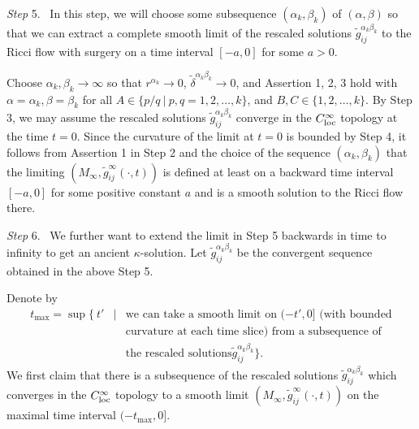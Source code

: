 \medskip
{\it Step} 5. \ In this step, we will choose some subsequence
$(\alpha_k,\beta_k)$ of $(\alpha,\beta)$ so that we can extract a
complete smooth limit of the rescaled solutions
$\widetilde{g}^{\alpha_k \beta_k}_{ij}$ to the Ricci flow with
surgery on a time interval $[-a,0]$ for some $a>0$.

Choose $\alpha_k,\beta_k\rightarrow\infty$ so that
$r^{\alpha_k}\rightarrow0$,
$\widetilde{\delta}^{\alpha_{k}\beta_{k}}\rightarrow 0$, and
Assertion 1, 2, 3 hold with $\alpha=\alpha_k, \beta=\beta_k$ for
all $A \in \{{p}/{q} \ |\ p, q=1, 2, \ldots, k\}$, and $B,C \in
\{1,2,\ldots,k\}$. By Step 3, we may assume the rescaled solutions
$\widetilde{g}^{\alpha_k \beta_k}_{ij}$ converge in the
$C^{\infty}_{\rm loc}$ topology at the time $t=0$. Since the
curvature of the limit at $t=0$ is bounded by Step 4, it follows
from Assertion 1 in Step 2 and the choice of the sequence
$(\alpha_k,\beta_k)$ that the limiting
$(M_{\infty},\widetilde{g}^{\infty}_{ij}(\cdot,t))$ is defined at
least on a backward time interval $[-a,0]$ for some positive
constant $a$ and is a smooth solution to the Ricci flow there.

\medskip
{\it Step} 6. \ We further want to extend the limit in Step 5
backwards in time to infinity to get an ancient $\kappa$-solution.
Let $\widetilde{g}^{\alpha_k \beta_k}_{ij}$ be the convergent
sequence obtained in the above Step 5.

Denote by
\begin{eqnarray*}
t_{\max} = \sup \Big\{\ t'&  |&  \mbox {we can take a
smooth limit on } (-t',0] \mbox{ (with bounded}  \\
& &   \mbox{curvature at each time slice) from a subsequence
of}\\
&   &   \mbox{the rescaled solutions
}\widetilde{g}^{\alpha_k\beta_k}_{ij} \Big\}.
\end{eqnarray*}
We first claim that there is a subsequence of the rescaled
solutions $\widetilde{g}^{\alpha_k\beta_k}_{ij}$ which converges
in the $C^{\infty}_{\rm loc}$ topology to a smooth limit
$(M_{\infty},\widetilde{g}^{\infty}_{ij}(\cdot,t))$ on the maximal
time interval $(-t_{\max},0]$.

